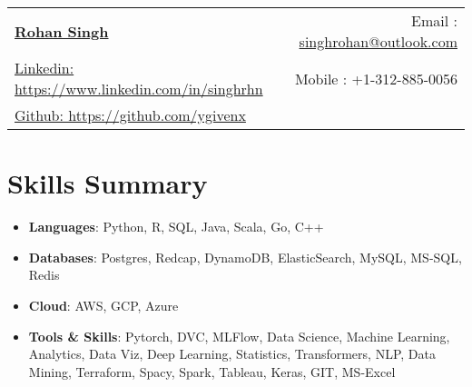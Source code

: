 \documentclass[letterpaper,10.8pt]{article}
\newcommand{\resumeItem}[2]{
  \item\small{
    \textbf{#1}{: #2 \vspace{-2pt}}
  }
}
\newcommand{\resumeSubItem}[2]{\resumeItem{#1}{#2}\vspace{-4pt}}
\newcommand{\resumeSubHeadingListStart}{\begin{itemize}[leftmargin=*]}
\newcommand{\resumeSubHeadingListEnd}{\end{itemize}}
\newcommand{\resumeItemListStart}{\begin{itemize}}
\newcommand{\resumeItemListEnd}{\end{itemize}\vspace{-5pt}}
\begin{document}
\begin{tabular*}{\textwidth}{l@{\extracolsep{\fill}}r}
  \textbf{\href{https://github.com/ramanujam/resume/blob/master/rohan_singh_tech.pdf}{\LARGE Rohan Singh}} & Email : \href{mailto:singhrohan@outlook.com}{singhrohan@outlook.com}\\
  \href{https://www.linkedin.com/in/singhrhn}{Linkedin: https://www.linkedin.com/in/singhrhn} & Mobile : +1-312-885-0056 \\
  \href{https://github.com/ygivenx}{Github: https://github.com/ygivenx}
\end{tabular*}

    

\section{Skills Summary}
	\resumeSubHeadingListStart
	\resumeSubItem{Languages}{Python, R, SQL, Java, Scala, Go, C++}
	\resumeSubItem{Databases}{ Postgres, Redcap, DynamoDB, ElasticSearch, MySQL, MS-SQL, Redis }
	\resumeSubItem{Cloud}{AWS, GCP, Azure }
	\resumeSubItem{Tools \& Skills}{ Pytorch, DVC, MLFlow, Data Science, Machine Learning, Analytics, Data Viz, Deep Learning, Statistics, Transformers, NLP, Data Mining, Terraform, Spacy, Spark, Tableau, Keras, GIT, MS-Excel}
\resumeSubHeadingListEnd
\end{document}
